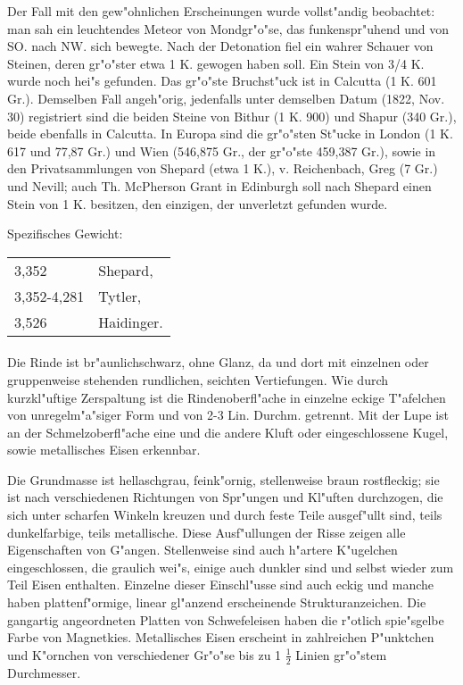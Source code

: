 \documentclass[a4paper, 11pt, oneside]{article}
\begin{document}
Der Fall mit den gew"ohnlichen Erscheinungen wurde vollst"andig beobachtet: man sah ein leuchtendes Meteor von Mondgr"o"se, das funkenspr"uhend und von SO. nach NW. sich bewegte. Nach der Detonation fiel ein wahrer Schauer von Steinen, deren gr"o"ster etwa 1 K. gewogen haben soll. Ein Stein von 3/4 K. wurde noch hei"s gefunden. Das gr"o"ste Bruchst"uck ist in Calcutta (1 K. 601 Gr.). Demselben Fall angeh"orig, jedenfalls unter demselben Datum (1822, Nov. 30) registriert sind die beiden Steine von Bithur (1 K. 900) und Shapur (340 Gr.), beide ebenfalls in Calcutta. In Europa sind die gr"o"sten St"ucke in London (1 K. 617 und 77,87 Gr.) und Wien (546,875 Gr., der gr"o"ste 459,387 Gr.), sowie in den Privatsammlungen von Shepard (etwa 1 K.), v. Reichenbach, Greg (7 Gr.) und Nevill; auch Th. McPherson Grant in Edinburgh soll nach Shepard einen Stein von 1 K. besitzen, den einzigen, der unverletzt gefunden wurde.

Spezifisches Gewicht:
\begin{table}[!ht]
    \centering
    \begin{tabular}{l l}
        3,352 & Shepard,\\
        3,352-4,281 & Tytler,\\
        3,526 & Haidinger.
    \end{tabular}
\end{table}
\paragraph{}
Die Rinde ist br"aunlichschwarz, ohne Glanz, da und dort mit einzelnen oder gruppenweise stehenden rundlichen, seichten Vertiefungen. Wie durch kurzkl"uftige Zerspaltung ist die Rindenoberfl"ache in einzelne eckige T"afelchen von unregelm"a"siger Form und von 2-3 Lin. Durchm. getrennt. Mit der Lupe ist an der Schmelzoberfl"ache eine und die andere Kluft oder eingeschlossene Kugel, sowie metallisches Eisen erkennbar.

Die Grundmasse ist hellaschgrau, feink"ornig, stellenweise braun rostfleckig; sie ist nach verschiedenen Richtungen von Spr"ungen und Kl"uften durchzogen, die sich unter scharfen Winkeln kreuzen und durch feste Teile ausgef"ullt sind, teils dunkelfarbige, teils metallische. Diese Ausf"ullungen der Risse zeigen alle Eigenschaften von G"angen. Stellenweise sind auch h"artere K"ugelchen eingeschlossen, die graulich wei"s, einige auch dunkler sind und selbst wieder zum Teil Eisen enthalten. Einzelne dieser Einschl"usse sind auch eckig und manche haben plattenf"ormige, linear gl"anzend erscheinende Strukturanzeichen. Die gangartig angeordneten Platten von Schwefeleisen haben die r"otlich spie"sgelbe Farbe von Magnetkies. Metallisches Eisen erscheint in zahlreichen P"unktchen und K"ornchen von verschiedener Gr"o"se bis zu 1 $\frac{1}{2}$ Linien gr"o"stem Durchmesser.
\end{document}
